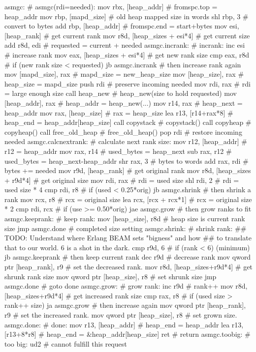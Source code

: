 \begin{asm}
asmgc:					    # asmgc(rdi=needed):
	mov	rbx, [heap_addr]	    #   fromspc.top = heap_addr
	mov	rbp, [mapd_size]	    #   old heap mapped size in words
	shl	rbp, 3			    #   convert to bytes
	add	rbp, [heap_addr]	    #   fromspc.end = start+bytes
	mov	esi, [heap_rank]	    #   get current rank
	mov	r8d, [heap_sizes + esi*4]   #   get current size
	add	r8d, edi		    #   requested = current + needed
asmgc.incrank:				    # incrank:
	inc	esi			    #   increase rank
	mov	eax, [heap_sizes + esi*4]   #   get new rank size
	cmp	eax, r8d		    #   if (new rank size < requested)
	jb	asmgc.incrank		    #	then increase rank again
	mov	[mapd_size], rax	    #   mapd_size = new_heap_size
	mov	[heap_size], rax	    #   heap_size = mapd_size
	push	rdi			    #   preserve incoming needed
	mov	rdi, rax		    #   rdi = large enough size
	call	heap_new		    #   heap_new(size to hold requested)
	mov	[heap_addr], rax	    #   heap_addr = heap_new(...)
	mov	r14, rax		    #   heap_next = heap_addr
	mov	rax, [heap_size]	    #   rax = heap_size
	lea	r13, [r14+rax*8]	    #   heap_end = heap_addr[heap_size]
	call	copystack		    #   copystack()
	call	copyheap		    #   copyheap()
	call	free_old_heap		    #   free_old_heap()
	pop	rdi			    #   restore incoming needed
asmgc.calcnextrank:			    # calculate next rank size:
	mov	r12, [heap_addr]	    #   r12 = heap_addr
	mov	rax, r14                    #   used_bytes = heap_next
	sub	rax, r12                    #   used_bytes = heap_next-heap_addr
	shr	rax, 3			    #   bytes to words
	add	rax, rdi		    #   bytes += needed
	mov	r9d, [heap_rank]	    #   get original rank
	mov	r8d, [heap_sizes + r9d*4]   #   get original size
	mov	rdi, rax		    #   rdi = used size
	shl	rdi, 2			    #   rdi = used size * 4
	cmp	rdi, r8			    #   if (used < 0.25*orig)
	jb	asmgc.shrink		    #   then shrink a rank
	mov	rcx, r8			    #   rcx = original size
	lea     rcx, [rcx + rcx*1]	    #   rcx = original size * 2
	cmp	rdi, rcx		    #   if (use >= 0.50*orig)
	jae     asmgc.grow		    #  	then grow ranks to fit
asmgc.keeprank:				    # keep rank:
	mov	[heap_size], r8d	    #   heap size is current rank size
	jmp	asmgc.done		    #   completed size setting
asmgc.shrink:				    # shrink rank:
	## TODO: Understand where Erlang BEAM sets "bigness" and how
	## to translate that to our world. 6 is a shot in the dark.
	cmp	r9d, 6			    #   if (rank < 6) (minimum)
	jb	asmgc.keeprank		    #   then keep current rank
	dec	r9d			    #   decrease rank
	mov	qword ptr [heap_rank], r9   #   set the decreased rank.
	mov	r8d, [heap_sizes+r9d*4]	    #   get shrunk rank size
	mov	qword ptr [heap_size], r8   #   set shrunk size
	jmp	asmgc.done		    #   goto done
asmgc.grow:				    # grow rank:
	inc	r9d			    #   rank++
	mov	r8d, [heap_sizes+r9d*4]	    #   get increased rank size
	cmp	rax, r8			    #   if (used size > rank++ size)
	ja	asmgc.grow		    #   then increase again
	mov	qword ptr [heap_rank], r9   #   set the increased rank.
	mov	qword ptr [heap_size], r8   #   set grown size.
asmgc.done:				    # done:
	mov	r13, [heap_addr]	    #   heap_end = heap_addr
	lea	r13, [r13+8*r8]		    #   heap_end = &heap_addr[heap_size]
	ret				    #   return
asmgc.toobig:				    # too big:
	ud2				    #   cannot fulfill this request
\end{asm}

